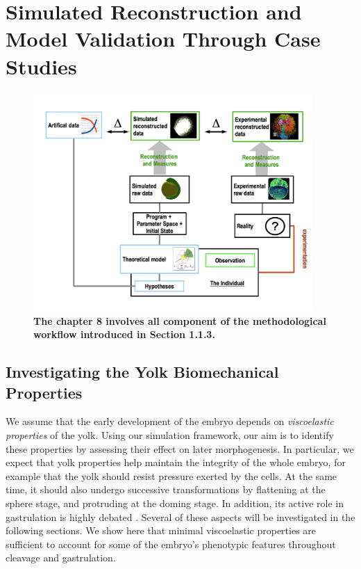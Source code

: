 

\section{Simulated Reconstruction and Model Validation Through Case Studies}
\begin{figure}
\begin{center}
\includegraphics[width=0.95\textwidth]{../../images/experimental_science/experimental_science_cleaner.png}
\end{center}
\caption{\textbf{The chapter 8 involves all component of the methodological workflow introduced in Section 1.1.3.}}
\label{experimental_science_experimental_science_cleaner_chap8}
\end{figure}


\subsection{Investigating the Yolk Biomechanical Properties}


We assume that the early development of the embryo depends on \textit{viscoelastic properties} of the yolk. Using our simulation framework, our aim is to identify these properties by assessing their effect on later morphogenesis. In particular, we expect that yolk properties help maintain the integrity of the whole embryo, for example that the yolk should resist pressure exerted by the cells. At the same time, it should also undergo successive transformations by flattening at the sphere stage, and protruding at the doming stage. In addition, its active role in gastrulation is highly debated \cite{Behrndt:2012gy}. Several of these aspects will be investigated in the following sections. We show here that minimal viscoelastic properties are sufficient to account for some of the embryo's phenotypic features throughout cleavage and gastrulation.


